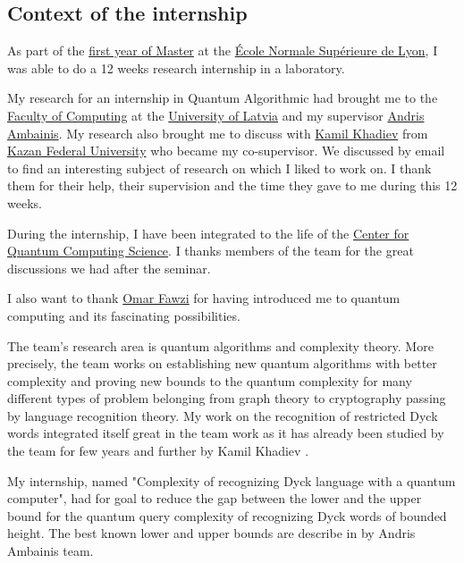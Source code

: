 \subsection*{Context of the internship}

As part of the \href{http://informatique.ens-lyon.fr/en/academic-programs/master/m1}{first year of Master} at the
\href{http://www.ens-lyon.fr/en/}{École Normale Supérieure de Lyon},
I was able to do a 12 weeks research internship in a laboratory.

My research for an internship in Quantum Algorithmic had brought me to
the \href{https://www.lu.lv/en/studies/faculties/faculty-of-computing/}{Faculty of Computing}
at the \href{https://www.lu.lv/}{University of Latvia}
and my supervisor \href{http://home.lu.lv/~ambainis/}{Andris Ambainis}. My research also
brought me to discuss with \href{https://kpfu.ru/Kamil.Hadiev?p_lang=2}{Kamil Khadiev}
from \href{https://eng.kpfu.ru/}{Kazan Federal University} who became my co-supervisor.
We discussed by email to find an interesting subject of research on which I
liked to work on. I thank them for their help, their supervision and the time they
gave to me during this 12 weeks.

During the internship, I have been integrated to the life of the
\href{https://quantum.lu.lv/}{Center for Quantum Computing Science}.
I thanks members of the team for the great discussions we had after
the seminar.

I also want to thank \href{https://perso.ens-lyon.fr/omar.fawzi/}{Omar Fawzi} for
having introduced me to quantum computing and its fascinating possibilities.

The team's research area is quantum algorithms and complexity theory. More precisely,
the team works on establishing new quantum algorithms with better complexity and proving
new bounds to the quantum complexity for many different types of problem belonging
from graph theory to cryptography passing by language recognition theory. My work on
the recognition of restricted Dyck words integrated itself great in the team work as it
has already been studied by the team for few years \cite{art:2DGrid} and further by
Kamil Khadiev \cite{DBLP:conf/uc/KhadievK21}.

My internship, named "Complexity of recognizing Dyck language with a
quantum computer", had for goal to reduce the gap between the lower and the upper bound for
the quantum query complexity of recognizing Dyck words of bounded height. The best
known lower and upper bounds are describe in \cite{art:2DGrid} by Andris Ambainis team.


